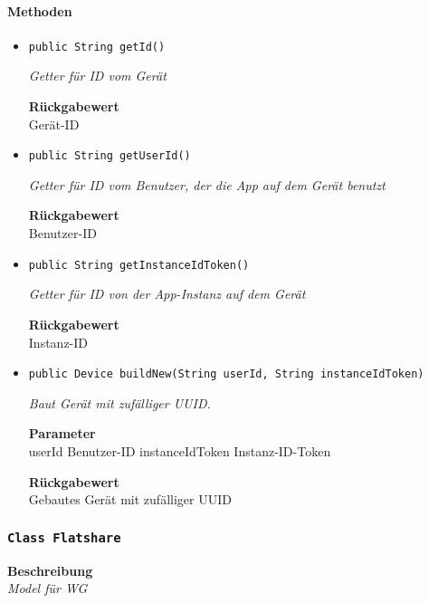     \paragraph*{Methoden}
    \begin{itemize}
    	\item{\texttt{public String getId()}}
    	
    	\textit{Getter für ID vom Gerät}
    	
    	
    	
    	\textbf{Rückgabewert} \\
    	Gerät-ID        \item{\texttt{public String getUserId()}}
    	
    	\textit{Getter für ID vom Benutzer, der die App auf dem Gerät benutzt}
    	
    	
    	
    	\textbf{Rückgabewert} \\
    	Benutzer-ID        \item{\texttt{public String getInstanceIdToken()}}
    	
    	\textit{Getter für ID von der App-Instanz auf dem Gerät}
    	
    	
    	
    	\textbf{Rückgabewert} \\
    	Instanz-ID        \item{\texttt{public Device buildNew(String userId, String instanceIdToken)}}
    	
    	\textit{Baut Gerät mit zufälliger UUID.}
    	
    	\textbf{Parameter} \\
    	userId Benutzer-ID
    	instanceIdToken Instanz-ID-Token
    	
    	\textbf{Rückgabewert} \\
    	Gebautes Gerät mit zufälliger UUID
    \end{itemize}
    \subsubsection{\texttt{Class Flatshare}}
    \textbf{Beschreibung} \\
    \textit{Model für WG}
